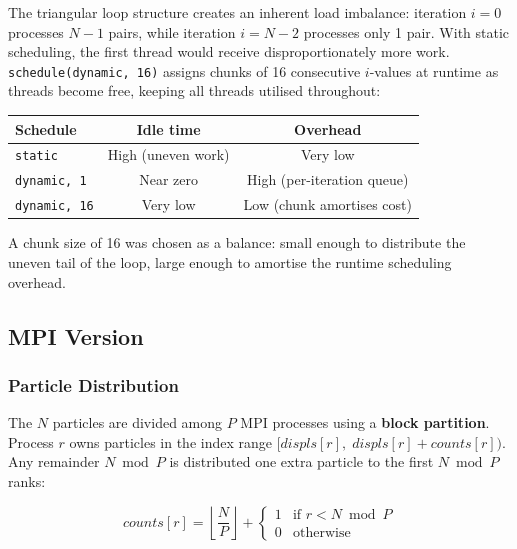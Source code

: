 ﻿\documentclass[12pt,a4paper]{article}
\begin{document}
The triangular loop structure creates an inherent load imbalance:
iteration $i=0$ processes $N-1$ pairs, while iteration $i=N-2$ processes
only 1 pair. With static scheduling, the first thread would receive
disproportionately more work. \texttt{schedule(dynamic, 16)} assigns chunks
of 16 consecutive $i$-values at runtime as threads become free, keeping all
threads utilised throughout:

\begin{center}
\begin{tabular}{lcc}
    \toprule
    \textbf{Schedule} & \textbf{Idle time} & \textbf{Overhead} \\
    \midrule
    \texttt{static}          & High (uneven work) & Very low \\
    \texttt{dynamic, 1}      & Near zero          & High (per-iteration queue) \\
    \texttt{dynamic, 16}     & Very low           & Low (chunk amortises cost) \\
    \bottomrule
\end{tabular}
\end{center}

A chunk size of 16 was chosen as a balance: small enough to distribute
the uneven tail of the loop, large enough to amortise the runtime
scheduling overhead.

\subsection{MPI Version}

\subsubsection*{Particle Distribution}

The $N$ particles are divided among $P$ MPI processes using a \textbf{block
partition}. Process $r$ owns particles in the index range
$[\textit{displs}[r],\;\textit{displs}[r] + \textit{counts}[r])$.
Any remainder $N \bmod P$ is distributed one extra particle to the
first $N \bmod P$ ranks:

\begin{equation}
    \textit{counts}[r] = \left\lfloor \frac{N}{P} \right\rfloor +
    \begin{cases} 1 & \text{if } r < N \bmod P \\ 0 & \text{otherwise} \end{cases}
\end{equation}
\end{document}
